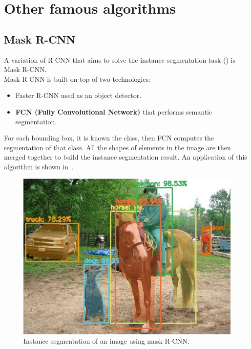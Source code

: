 \section{Other famous algorithms}
\subsection{Mask R-CNN} \label{sec:mask-r-cnn}
A variation of R-CNN that aims to solve the instance segmentation task () is Mask R-CNN\cite{mask-r-cnn}.\\
Mask R-CNN is built on top of two technologies:
\begin{itemize}
	\item Faster R-CNN used as an object detector.
	\item \textbf{FCN (Fully Convolutional Network)}\cite{fcn} that performs semantic segmentation.
\end{itemize}
For each bounding box, it is known the class, then FCN computes the segmentation of that class. All the shapes of elements in the image are then merged together to build the instance segmentation result. An application of this algorithm is shown in~.

\begin{figure}[!h]
	\centering
	\includegraphics[width=0.7\linewidth]{images/detection/ex2_maskRCNN}
	\caption{Instance segmentation of an image using mask R-CNN.}
	\label{fig:ex2_maskRCNN}
\end{figure}


